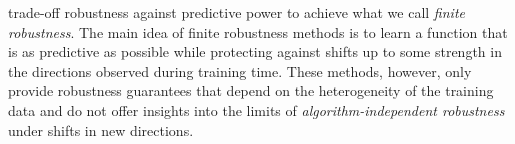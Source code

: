 trade-off robustness against predictive power to achieve what we call \emph{finite robustness}. 
The main idea of finite robustness methods is to learn a function that is as predictive as possible while protecting against shifts up to some strength in the directions observed during training time.
These methods, however, only provide robustness guarantees that depend on the heterogeneity of the training data and do not offer insights into the limits of \emph{algorithm-independent robustness} under shifts in new directions. 



